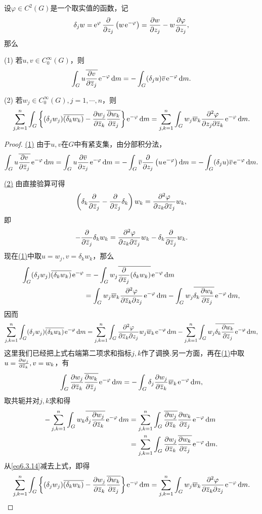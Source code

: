 \begin{lemma}\label{lem6.3.7}
		设$\varphi\in C^2(G)$是一个取实值的函数，记
		\[\delta_j w=\operatorname{\!\!\;\mathrm e}^\varphi \frac{\partial }{\partial z_j}\left(w\operatorname{\!\!\;\mathrm e}^{-\varphi}\right)=\frac{\partial w}{\partial z_j}-w\frac{\partial \varphi}{\partial z_j},\]
		那么
		
		(1)\hypertarget{6.3.7}{}
		若$u,v\in C_0^\infty(G)$，则
		\[\int_G u{}\mkern1mu\overline{\mkern-1mu\frac{\partial v}{\partial {}\mkern1mu\overline{\mkern-1muz}_j}}\operatorname{\!\!\;\mathrm e}^{-\varphi}\mathop{}\!\mathrm{d} m=-\int_G (\delta_j u){}\mkern1mu\overline{\mkern-1muv}\operatorname{\!\!\;\mathrm e}^{-\varphi}\mathop{}\!\mathrm{d} m.\]
		
		
		(2)\hypertarget{6.3.7}{}
		若$w_j\in C_0^\infty(G),j=1,\cdots,n$，则
		\[\sum_{j,k=1}^{n}\int_G\left\{(\delta_j w_j)\bar{(\delta_k w_k)}-\pp{w_j}{\bar{z}_k}\bar{\pp{w_k}{\bar{z}_j}}\right\}\ee^{-\varphi}\dif m=\sum_{j,k=1}^{n}\int_G w_j\bar{w}_k\pppp{\varphi}{z_j}{\bar{z}_k}\ee^{-\varphi}\dif m.\]
\end{lemma}
\begin{proof}	
	\hyperlink{6.3.7}{(1)}
	由于$u,v$在$G$中有紧支集，由分部积分法，
	\[\int_G u\bar{\pp{v}{\bar{z}_j}}\ee^{-\varphi}\dif m=\int_G u\pp{\bar{v}}{z_j}\ee^{-\varphi}\dif m=-\int_G \bar{v}\pp{}{z_j}\left(u\ee^{-\varphi}\right)\dif m=-\int_G(\delta_j u)\bar{v}\ee^{-\varphi}\dif m.\]
	
	\hyperlink{6.3.7}{(2)}
	由直接验算可得
	\[\left(\delta_k\frac{\partial }{\partial {}\mkern1mu\overline{\mkern-1muz}_j}-\frac{\partial }{\partial {}\mkern1mu\overline{\mkern-1muz}_j}\delta_k\right)w_k=\frac{\partial^2 \varphi}{\partial z_k\partial {}\mkern1mu\overline{\mkern-1muz}_j}w_k,\]
	即
	\[-\frac{\partial }{\partial {}\mkern1mu\overline{\mkern-1muz}_j}\delta_kw_k=\frac{\partial^2 \varphi}{\partial z_k\partial {}\mkern1mu\overline{\mkern-1muz}_j}w_k-\delta_k\frac{\partial }{\partial {}\mkern1mu\overline{\mkern-1muz}_j}w_k.\]
	现在\hyperlink{6.3.7}{(1)}中取$u=w_j,v=\delta_k w_k$，那么
	\begin{align*}
		\int_G(\delta_jw_j)\bar{(\delta_kw_k)}\ee^{-\varphi}
		&=-\int_G w_j\bar{\pp{}{\bar{z}_j}(\delta_kw_k)}\ee^{-\varphi}\dif m\\
		&=\int_G w_j\bar{w}_k\pppp{\varphi}{\bar{z}_k}{z_j}\ee^{-\varphi}\dif m-\int_G w_j\bar{\delta_k\pp{w_k}{\bar{z}_j}}\ee^{-\varphi}\dif m,
	\end{align*}
	因而
	\begin{equation}\label{eq6.3.14}
		\sum_{j,k=1}^{n}\int_G(\delta_jw_j)\bar{(\delta_kw_k)}\ee^{-\varphi}\dif m
		=\sum_{j,k=1}^{n}\int_G\pppp{\varphi}{\bar{z}_k}{z_j}w_j\bar{w}_k\ee^{-\varphi}\dif m-\sum_{j,k=1}^{n}\int_Gw_j\bar{\delta_k\pp{w_k}{\bar{z}_j}}\ee^{-\varphi}\dif m,
	\end{equation}
	这里我们已经把上式右端第二项求和指标$j,k$作了调换.另一方面，再在\hyperlink{6.3.7}{(1)}中取$u=\frac{\partial w_j}{\partial {}\mkern1mu\overline{\mkern-1muz}_k},v=w_k$，有
	\[\int_G \frac{\partial w_j}{\partial {}\mkern1mu\overline{\mkern-1muz}_k}{}\mkern1mu\overline{\mkern-1mu\frac{\partial w_k}{\partial {}\mkern1mu\overline{\mkern-1muz}_j}}\operatorname{\!\!\;\mathrm e}^{-\varphi}\mathop{}\!\mathrm{d} m=-\int_G \delta_j\frac{\partial w_j}{\partial {}\mkern1mu\overline{\mkern-1muz}_k}{}\mkern1mu\overline{\mkern-1muw}_k\operatorname{\!\!\;\mathrm e}^{-\varphi}\mathop{}\!\mathrm{d} m,\]
	取共轭并对$j,k$求和得
	\begin{align*}
		-\sum_{j,k=1}^n\int_G w_k\bar{\delta_j\pp{w_j}{\bar{z}_k}}\ee^{-\varphi}\dif m
		&=\sum_{j,k=1}^n\int_G \bar{\pp{w_j}{\bar{z}_k}}\pp{w_k}{\bar{z}_j}\ee^{-\varphi}\dif m\\
		&=\sum_{j,k=1}^n \int_G \pp{w_j}{\bar{z}_k}\bar{\pp{w_k}{\bar{z}_j}}\ee^{-\varphi}\dif m.
	\end{align*}
	从\eqref{eq6.3.14}减去上式，即得
	\[\sum_{j,k=1}^{n}\int_G\left\{(\delta_j w_j)\bar{(\delta_k w_k)}-\pp{w_j}{\bar{z}_k}\bar{\pp{w_k}{\bar{z}_j}}\right\}\ee^{-\varphi}\dif m=\sum_{j,k=1}^{n}\int_G w_j\bar{w}_k\pppp{\varphi}{\bar{z}_k}{z_j}\ee^{-\varphi}\dif m.\qedhere\]
\end{proof}
